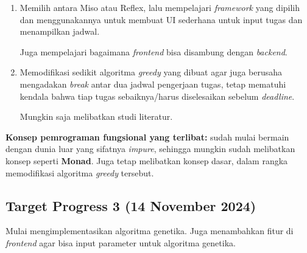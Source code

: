 \documentclass{article}
\begin{document}
\begin{enumerate}
    \item Memilih antara Miso atau Reflex, lalu mempelajari \textit{framework} yang dipilih dan menggunakannya untuk membuat UI sederhana untuk input tugas dan menampilkan jadwal.
    
    Juga mempelajari bagaimana \textit{frontend} bisa disambung dengan \textit{backend}.

    \item Memodifikasi sedikit algoritma \textit{greedy} yang dibuat agar juga berusaha mengadakan \textit{break} antar dua jadwal pengerjaan tugas, tetap mematuhi kendala bahwa tiap tugas sebaiknya/harus diselesaikan sebelum \textit{deadline}.
    
    Mungkin saja melibatkan studi literatur.
\end{enumerate}

\textbf{Konsep pemrograman fungsional yang terlibat:} sudah mulai bermain dengan dunia luar yang sifatnya \textit{impure}, sehingga mungkin sudah melibatkan konsep seperti \textbf{Monad}. Juga tetap melibatkan konsep dasar, dalam rangka memodifikasi algoritma \textit{greedy} tersebut.

\subsection*{Target Progress 3 (14 November 2024)}

Mulai mengimplementasikan algoritma genetika. Juga menambahkan fitur di \textit{frontend} agar bisa input parameter untuk algoritma genetika.
\end{document}
